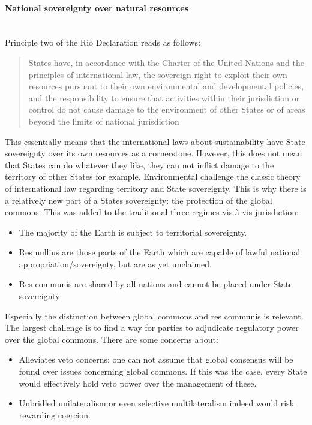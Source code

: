 \documentclass[../summary.tex]{subfiles}
\begin{document}
			\paragraph{National sovereignty over natural resources}\mbox{}\\
				\label{par:national-sovereignty-over-natural-resources}
				Principle two of the Rio Declaration reads as follows:
				\begin{quote}
					States have, in accordance with the Charter of the United Nations and the principles of international law, the sovereign right to exploit their own resources pursuant to their own environmental and developmental policies, and the responsibility to ensure that activities within their jurisdiction or control do not cause damage to the environment of other States or of areas beyond the limits of national jurisdiction
				\end{quote}
				This essentially means that the international laws about sustainability have State sovereignty over its own resources as a cornerstone. However, this does not mean that States can do whatever they like, they can not inflict damage to the territory of other States for example. Environmental challenge the classic theory of international law regarding territory and State sovereignty.  This is why there is a relatively new part of a States sovereignty: the protection of the global commons. This was added to the traditional three regimes vis-à-vis jurisdiction:
				\begin{itemize}
					\item The majority of the Earth is subject to territorial sovereignty.
					\item Res nullius are those parts of the Earth which are capable of lawful national appropriation/sovereignty, but are as yet unclaimed.
					\item Res communis are shared by all nations and cannot be placed under State sovereignty
				\end{itemize}
				Especially the distinction between global commons and res communis is relevant. The largest challenge is to find a way for parties to adjudicate regulatory power over the global commons. There are some concerns about:
				\begin{itemize}
					\item Alleviates veto concerns: one can not assume that global consensus will be found over issues concerning global commons. If this was the case, every State would effectively hold veto power over the management of these. 
					\item Unbridled unilateralism or even selective multilateralism indeed would risk rewarding coercion.
				\end{itemize}
				
\end{document}
